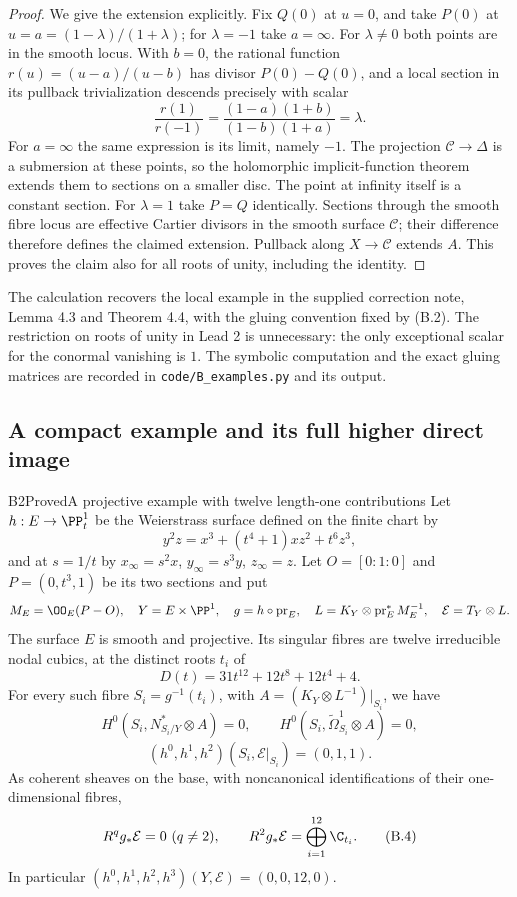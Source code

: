 \begin{proof}
We give the extension explicitly. Fix $Q(0)$ at $u=0$, and take $P(0)$ at $u=a=(1-\lambda)/(1+\lambda)$; for $\lambda=-1$ take $a=\infty$. For $\lambda\ne0$ both points are in the smooth locus. With $b=0$, the rational function $r(u)=(u-a)/(u-b)$ has divisor $P(0)-Q(0)$, and a local section in its pullback trivialization descends precisely with scalar
\[
 \frac{r(1)}{r(-1)}
 =\frac{(1-a)(1+b)}{(1-b)(1+a)}=\lambda.
\]
For $a=\infty$ the same expression is its limit, namely $-1$. The projection $\mathcal C\to\Delta$ is a submersion at these points, so the holomorphic implicit-function theorem extends them to sections on a smaller disc. The point at infinity itself is a constant section. For $\lambda=1$ take $P=Q$ identically. Sections through the smooth fibre locus are effective Cartier divisors in the smooth surface $\mathcal C$; their difference therefore defines the claimed extension. Pullback along $X\to\mathcal C$ extends $A$. This proves the claim also for all roots of unity, including the identity.
\end{proof}

The calculation recovers the local example in the supplied correction note, Lemma 4.3 and Theorem 4.4, with the gluing convention fixed by (B.2). The restriction on roots of unity in Lead 2 is unnecessary: the only exceptional scalar for the conormal vanishing is $1$. The symbolic computation and the exact gluing matrices are recorded in \texttt{code/B\_examples.py} and its output.

\subsection{A compact example and its full higher direct image}

\begin{statement}{B2}{Proved}{A projective example with twelve length-one contributions}
Let $h:E\to\PP^1_t$ be the Weierstrass surface defined on the finite chart by
\[
 y^2z=x^3+(t^4+1)xz^2+t^6z^3,                          \tag{B.3}
\]
and at $s=1/t$ by $x_\infty=s^2x$, $y_\infty=s^3y$, $z_\infty=z$. Let $O=[0:1:0]$ and $P=(0,t^3,1)$ be its two sections and put
\[
 M_E=\OO_E(P-O),\quad Y=E\times\PP^1,\quad
 g=h\circ\operatorname{pr}_E,\quad
 L=K_Y\otimes\operatorname{pr}_E^*M_E^{-1},\quad
 \mathcal E=T_Y\otimes L.
\]
The surface $E$ is smooth and projective. Its singular fibres are twelve irreducible nodal cubics, at the distinct roots $t_i$ of
\[
 D(t)=31t^{12}+12t^8+12t^4+4.
\]
For every such fibre $S_i=g^{-1}(t_i)$, with $A=(K_Y\otimes L^{-1})|_{S_i}$, we have
\[
H^0(S_i,N^*_{S_i/Y}\otimes A)=0,
\qquad H^0(S_i,\widetilde\Omega^1_{S_i}\otimes A)=0,
\]
\[
 (h^0,h^1,h^2)(S_i,\mathcal E|_{S_i})=(0,1,1).
\]
As coherent sheaves on the base, with noncanonical identifications of their one-dimensional fibres,
\[
 R^qg_*\mathcal E=0\ (q\ne2),\qquad
 R^2g_*\mathcal E=\bigoplus_{i=1}^{12}\C_{t_i}.        \tag{B.4}
\]
In particular $(h^0,h^1,h^2,h^3)(Y,\mathcal E)=(0,0,12,0)$.
\end{statement}

